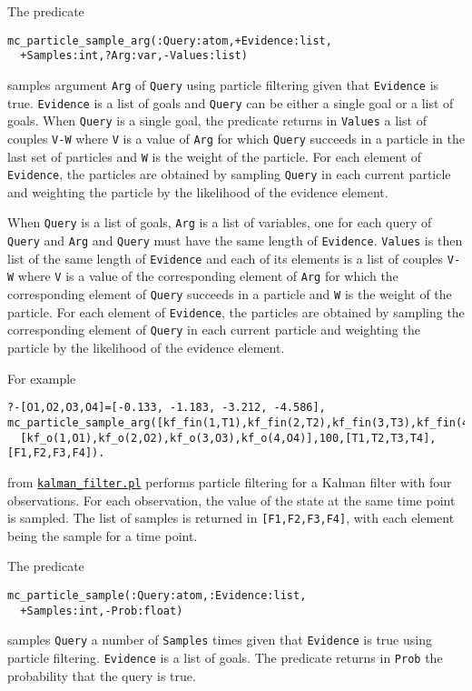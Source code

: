 The predicate
\begin{verbatim}
mc_particle_sample_arg(:Query:atom,+Evidence:list,
  +Samples:int,?Arg:var,-Values:list) 
\end{verbatim}
samples argument \verb|Arg| of \verb|Query| using particle filtering 
given that 
\verb|Evidence|
is true. \verb|Evidence| is a list of goals and \verb|Query| can be either
a single goal or a list of goals.
When \verb|Query| is a single goal, the predicate returns in \verb|Values| a list of couples \verb|V-W| where
\verb|V| is a value of \verb|Arg| for which \verb|Query| succeeds in
a particle in the last set of particles and \verb|W| is the weight of the particle.
For each element of \verb|Evidence|, the particles are obtained by sampling \verb|Query|
in each current particle and weighting the particle by the likelihood of the evidence element.

When \verb|Query| is a list of goals,  \verb|Arg| is a list of variables, one for 
each query of \verb|Query| and \verb|Arg| and \verb|Query| must have the same length of \verb|Evidence|.
\verb|Values| is then list of the same length of \verb|Evidence| and each of its
elements is a list of couples \verb|V-W| where
\verb|V| is a value of the corresponding element of \verb|Arg| for which the corresponding element of
\verb|Query| succeeds in
a particle and \verb|W| is the weight of the particle.
For each element of \verb|Evidence|, the particles are obtained by sampling the corresponding element of \verb|Query|
in each current particle and weighting the particle by the likelihood of the evidence element.


For example
\begin{verbatim}
?-[O1,O2,O3,O4]=[-0.133, -1.183, -3.212, -4.586],
mc_particle_sample_arg([kf_fin(1,T1),kf_fin(2,T2),kf_fin(3,T3),kf_fin(4,T4)],
  [kf_o(1,O1),kf_o(2,O2),kf_o(3,O3),kf_o(4,O4)],100,[T1,T2,T3,T4],[F1,F2,F3,F4]).
\end{verbatim}
from \href{http://cplint.lamping.unife.it/example/inference/kalman_filter.pl}{\texttt{kalman\_filter.pl}} performs
particle filtering for a Kalman filter with four observations. For each observation, the value of the state 
at the same time point is sampled. The list of samples is returned in \verb|[F1,F2,F3,F4]|, with each element
being the sample for a time point. 

The predicate
\begin{verbatim}
mc_particle_sample(:Query:atom,:Evidence:list,
  +Samples:int,-Prob:float)
\end{verbatim}
samples \verb|Query|  a number of \verb|Samples| times given that 
\verb|Evidence|
is true using particle filtering. \verb|Evidence| is a list of goals.
The predicate returns in \verb|Prob| the probability that the query is true.

